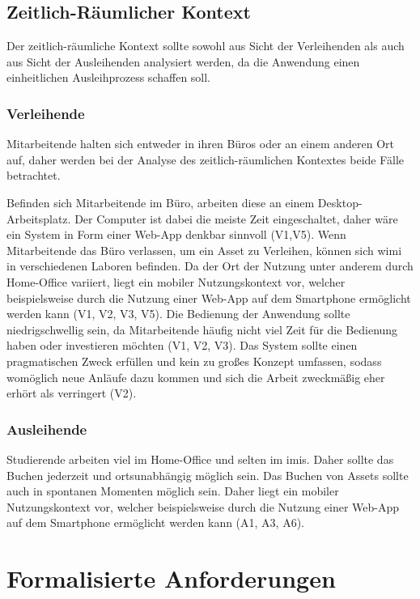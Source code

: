 \subsection{Zeitlich-Räumlicher Kontext}
\label{section:zeit}
Der zeitlich-räumliche Kontext sollte sowohl aus Sicht der Verleihenden als auch aus Sicht der
Ausleihenden analysiert werden, da die Anwendung einen einheitlichen Ausleihprozess schaffen soll.

\subsubsection{Verleihende}
Mitarbeitende halten sich entweder in ihren Büros oder an einem anderen Ort auf, daher werden bei
der Analyse des zeitlich-räumlichen Kontextes beide Fälle betrachtet.

Befinden sich Mitarbeitende im Büro, arbeiten diese an einem Desktop-Arbeitsplatz. Der Computer ist
dabei die meiste Zeit eingeschaltet, daher wäre ein System in Form einer Web-App denkbar sinnvoll
(V1,V5). Wenn Mitarbeitende das Büro verlassen, um ein Asset zu Verleihen, können sich \ac{wimi} in
verschiedenen Laboren befinden. Da der Ort der Nutzung unter anderem durch Home-Office variiert,
liegt ein mobiler Nutzungskontext vor, welcher beispielsweise durch die Nutzung einer Web-App auf
dem Smartphone ermöglicht werden kann (V1, V2, V3, V5). Die Bedienung der Anwendung sollte
niedrigschwellig sein, da Mitarbeitende häufig nicht viel Zeit für die Bedienung haben oder
investieren möchten (V1, V2, V3). Das System sollte einen pragmatischen Zweck erfüllen und kein zu
großes Konzept umfassen, sodass womöglich neue Anläufe dazu kommen und sich die Arbeit zweckmäßig
eher erhört als verringert (V2). 


\subsubsection{Ausleihende}
Studierende arbeiten viel im Home-Office und selten im \ac{imis}. Daher sollte das Buchen jederzeit
und ortsunabhängig möglich sein. Das Buchen von Assets sollte auch in spontanen Momenten möglich
sein. Daher liegt ein mobiler Nutzungskontext vor, welcher beispielsweise durch die Nutzung einer
Web-App auf dem Smartphone ermöglicht werden kann (A1, A3, A6).


\section{Formalisierte Anforderungen}
\label{section:anforderung}

